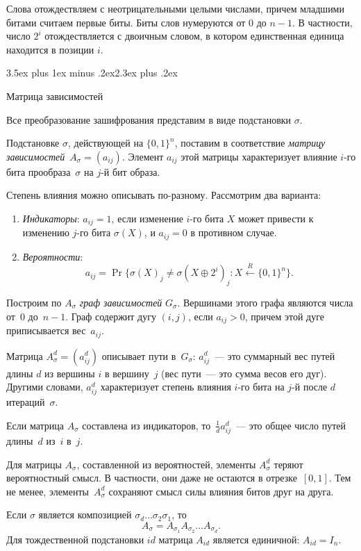 \documentclass[a4paper,12pt]{report}
\makeatletter
\theoremstyle{plain} %
\theoremstyle{definition}
\theoremstyle{remark}
\renewcommand{\section}{\@startsection{section}{1}{18pt}%
{3.5ex plus 1ex minus .2ex}{2.3ex plus .2ex}%
{\normalfont\Large\bfseries\raggedright}}%
\makeatother
\begin{document}
\begin{large}
Слова отождествляем с неотрицательными целыми числами,
причем младшими битами считаем первые биты.
Биты слов нумеруются от $0$ до $n-1$.
В частности, число $2^i$ отождествляется с двоичным словом,
в котором единственная единица находится в позиции $i$.

\section{Матрица зависимостей}

Все преобразование зашифрования представим в виде подстановки $\sigma$.

Подстановке $\sigma$, действующей на $\{0,1\}^n$, 
поставим в соответствие {\it матрицу зависимостей}~$A_\sigma=(a_{ij})$.
Элемент $a_{ij}$ этой матрицы характеризует влияние $i$-го
бита прообраза~$\sigma$ на $j$-й бит образа.

Степень влияния можно описывать по-разному.
Рассмотрим два варианта:
\begin{enumerate}
\item
{\it Индикаторы}: $a_{ij}=1$,
если изменение $i$-го бита $X$ может привести 
к изменению $j$-го бита $\sigma(X)$,
и $a_{ij}=0$ в противном случае.

\item
{\it Вероятности}: 
$$
a_{ij}=\Pr\big\{\sigma(X)_j\neq \sigma(X\oplus 2^i)_j\colon
X\stackrel{R}\leftarrow\{0,1\}^n\big\}.
$$
\end{enumerate}

Построим по $A_\sigma$ {\it граф зависимостей} $G_\sigma$.
Вершинами этого графа являются числа от~$0$ до~$n-1$.
Граф содержит дугу $(i,j)$, если $a_{ij}>0$,
причем этой дуге приписывается вес~$a_{ij}$.

Матрица $A_\sigma^d=(a_{ij}^d)$ описывает пути в~$G_\sigma$:
$a_{ij}^d$~--- это суммарный вес путей длины $d$ из вершины $i$
в вершину~$j$ (вес пути~--- это сумма весов его дуг).
Другими словами, $a_{ij}^d$ характеризует степень влияния 
$i$-го бита на $j$-й после $d$ итераций~$\sigma$.

Если матрица $A_\sigma$ составлена из индикаторов,
то~$\frac{1}{d}a_{ij}^d$~--- это общее число путей длины~$d$
из~$i$ в~$j$.

Для матрицы $A_\sigma$, составленной из вероятностей,
элементы $A_\sigma^d$ теряют вероятностный смысл.
В частности, они даже не остаются в отрезке~$[0,1]$.
%
Тем не менее, элементы~$A_\sigma^d$ сохраняют смысл силы 
влияния битов друг на друга.

Если $\sigma$ является композицией $\sigma_d\ldots\sigma_2\sigma_1$,
то
$$
A_\sigma=A_{\sigma_1}A_{\sigma_2}\ldots A_{\sigma_d}.
$$
Для тождественной подстановки $id$ матрица $A_{id}$
является единичной: $A_{id}=I_n$.


\end{large}
\end{document}

